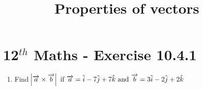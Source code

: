 \documentclass[12pt]{article}
\begin{document}
\begin{center}
\title{\textbf{Properties of vectors}}
\date{\vspace{-5ex}} %
\maketitle
\end{center}
\setcounter{page}{1}
\section{12$^{th}$ Maths - Exercise 10.4.1}

\begin{enumerate}
\item Find $\abs{\overrightarrow{a}\times\overrightarrow{b}}\text{ if }\overrightarrow{a}=\hat{i}-7\hat{j}+7\hat{k}\text{ and }\overrightarrow{b}=3\hat{i}-2\hat{j}+2\hat{k}$

\end{enumerate}
\end{document}
